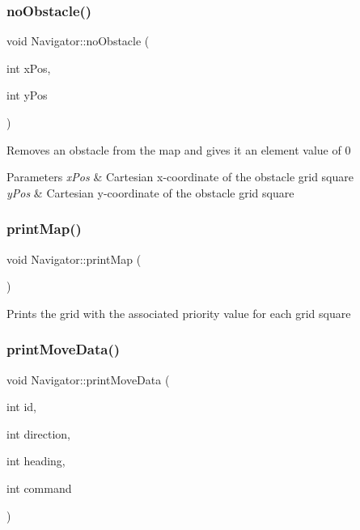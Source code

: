 \subsubsection{\texorpdfstring{no\+Obstacle()}{noObstacle()}}
{\footnotesize\ttfamily void Navigator\+::no\+Obstacle (\begin{DoxyParamCaption}\item[{int}]{x\+Pos,  }\item[{int}]{y\+Pos }\end{DoxyParamCaption})}

Removes an obstacle from the map and gives it an element value of 0


\begin{DoxyParams}{Parameters}
{\em x\+Pos} & Cartesian x-\/coordinate of the obstacle grid square \\
\hline
{\em y\+Pos} & Cartesian y-\/coordinate of the obstacle grid square \\
\hline
\end{DoxyParams}
\mbox{\label{class_navigator_a2565ae0fea67cfec45a553ef0d7e06a4}} 
\subsubsection{\texorpdfstring{print\+Map()}{printMap()}}
{\footnotesize\ttfamily void Navigator\+::print\+Map (\begin{DoxyParamCaption}{ }\end{DoxyParamCaption})}

Prints the grid with the associated priority value for each grid square \mbox{\label{class_navigator_a256336446ba7204c4b56cbfea2b9004f}} 
\subsubsection{\texorpdfstring{print\+Move\+Data()}{printMoveData()}}
{\footnotesize\ttfamily void Navigator\+::print\+Move\+Data (\begin{DoxyParamCaption}\item[{int}]{id,  }\item[{int}]{direction,  }\item[{int}]{heading,  }\item[{int}]{command }\end{DoxyParamCaption})}

